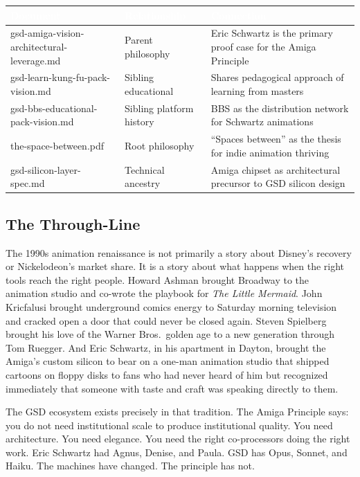 \documentclass[11pt,letterpaper]{article}
\newcommand{\tableheader}[1]{\textbf{\sffamily\textcolor{white}{#1}}}
\begin{document}
\begin{center}
\begin{tabularx}{\textwidth}{L{4.5cm}L{4cm}X}
\toprule
{}
\tableheader{Document} & \tableheader{Relationship} & \tableheader{Connection} \\
\midrule
gsd-amiga-vision-architectural-leverage.md & Parent philosophy & Eric Schwartz is the primary proof case for the Amiga Principle \\
gsd-learn-kung-fu-pack-vision.md & Sibling educational & Shares pedagogical approach of learning from masters \\
gsd-bbs-educational-pack-vision.md & Sibling platform history & BBS as the distribution network for Schwartz animations \\
the-space-between.pdf & Root philosophy & ``Spaces between'' as the thesis for indie animation thriving \\
gsd-silicon-layer-spec.md & Technical ancestry & Amiga chipset as architectural precursor to GSD silicon design \\
\bottomrule
\end{tabularx}
\end{center}

\subsection{The Through-Line}

The 1990s animation renaissance is not primarily a story about Disney's recovery or Nickelodeon's market share. It is a story about what happens when the right tools reach the right people. Howard Ashman brought Broadway to the animation studio and co-wrote the playbook for \textit{The Little Mermaid}. John Kricfalusi brought underground comics energy to Saturday morning television and cracked open a door that could never be closed again. Steven Spielberg brought his love of the Warner Bros.\ golden age to a new generation through Tom Ruegger. And Eric Schwartz, in his apartment in Dayton, brought the Amiga's custom silicon to bear on a one-man animation studio that shipped cartoons on floppy disks to fans who had never heard of him but recognized immediately that someone with taste and craft was speaking directly to them.

The GSD ecosystem exists precisely in that tradition. The Amiga Principle says: you do not need institutional scale to produce institutional quality. You need architecture. You need elegance. You need the right co-processors doing the right work. Eric Schwartz had Agnus, Denise, and Paula. GSD has Opus, Sonnet, and Haiku. The machines have changed. The principle has not.
\end{document}

